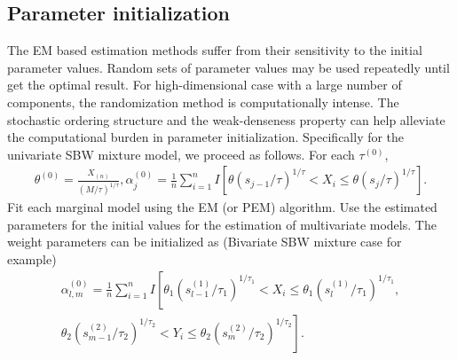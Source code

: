 \documentclass[11pt]{article}
\def\a{\alpha} \def\b{\beta}
\def\bea{\begin{eqnarray*}} \def\eea{\end{eqnarray*}}
\begin{document}
\subsection{Parameter initialization}\label{initial}
The EM based estimation methods suffer from their sensitivity to the initial parameter values. Random sets of parameter values may be used repeatedly until get the optimal result. For high-dimensional case with a large number of components, the randomization method is computationally intense. The stochastic ordering structure and the weak-denseness property can help alleviate the computational burden in parameter initialization. 
Specifically for the univariate SBW mixture model, we proceed as follows. For each $\tau^{(0)}$,
\bea
\theta^{(0)} = \frac{X_{(n)}}{(M/\tau)^{1/\tau}},  \a_j^{(0)} = \frac{1}{n}\sum_{i=1}^n I\left[\theta(s_{j-1}/\tau)^{1/\tau} < X_i \le \theta(s_j/\tau)^{1/\tau}\right]. 
\eea
Fit each marginal model using the EM (or PEM) algorithm. Use the estimated parameters for the initial values for the estimation of multivariate models. The weight parameters can be initialized as (Bivariate SBW mixture case for example)
\bea
\a_{l,m}^{(0)} = \frac{1}{n}\sum_{i=1}^n I\left[\theta_1(s^{(1)}_{l-1}/\tau_1)^{1/\tau_1} < X_i \le \theta_1(s^{(1)}_l/\tau_1)^{1/\tau_1},	\right.\\
   \left.  \theta_2(s^{(2)}_{m-1}/\tau_2)^{1/\tau_2} < Y_{i} \le \theta_2(s^{(2)}_m/\tau_2)^{1/\tau_2}\right].
\eea
\end{document}
